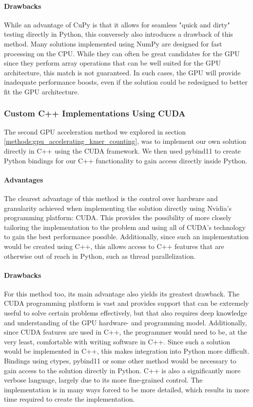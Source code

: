 \paragraph{Drawbacks}
While an advantage of CuPy is that it allows for seamless "quick and dirty" testing directly in Python, this conversely also introduces a drawback of this method.
Many solutions implemented using NumPy are designed for fast processing on the CPU.
While they can often be great candidates for the GPU since they perform array operations that can be well suited for the GPU architecture, this match is not guaranteed. 
In such cases, the GPU will provide inadequate performance boosts, even if the solution could be redesigned to better fit the GPU architecture.

\subsubsection{Custom C++ Implementations Using CUDA}
The second GPU acceleration method we explored in section \ref{methods:gpu_accelerating_kmer_counting}, was to implement our own solution directly in C++ using the CUDA framework.
We then used pybind11 to create Python bindings for our C++ functionality to gain access directly inside Python.

\paragraph{Advantages}
The clearest advantage of this method is the control over hardware and granularity achieved when implementing the solution directly using Nvidia's programming platform: CUDA.
This provides the possibility of more closely tailoring the implementation to the problem and using all of CUDA's technology to gain the best performance possible.
Additionally, since such an implementation would be created using C++, this allows access to C++ features that are otherwise out of reach in Python, such as thread parallelization.

\paragraph{Drawbacks}
For this method too, its main advantage also yields its greatest drawback.
The CUDA programming platform is vast and provides support that can be extremely useful to solve certain problems effectively, but that also requires deep knowledge and understanding of the GPU hardware- and programming model.
Additionally, since CUDA features are used in C++, the programmer would need to be, at the very least, comfortable with writing software in C++.
Since such a solution would be implemented in C++, this makes integration into Python more difficult.
Bindings using ctypes, pybind11 or some other method would be necessary to gain access to the solution directly in Python.
C++ is also a significantly more verbose language, largely due to its more fine-grained control.
The implementation is in many ways forced to be more detailed, which results in more time required to create the implementation.

